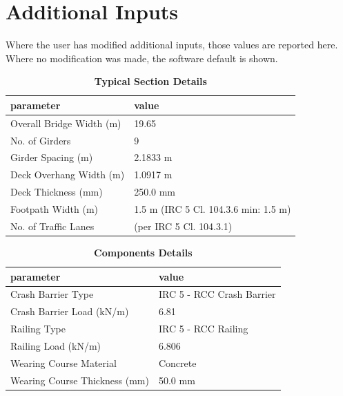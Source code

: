 \documentclass[12pt,a4paper]{report}
\numberwithin{table}{chapter}
\numberwithin{figure}{chapter}
\begin{document}
\newpage
\section{Additional Inputs}
\label{sec:additional-inputs}

Where the user has modified additional inputs, those values are reported here. Where no modification was made, the software default is shown.

\vspace{0.8cm}

\begin{longtable}{|L{5.5cm}|p{10.0cm}|}
\caption{\textbf{Typical Section Details}}
\hline
\textbf{parameter} & \textbf{value} \\
\hline
\textnormal{Overall Bridge Width (m)} & 19.65 \\[6pt]
\hline
\textnormal{No. of Girders} & 9 \\[6pt]
\hline
\textnormal{Girder Spacing (m)} & 2.1833 m \\[6pt]
\hline
\textnormal{Deck Overhang Width (m)} & 1.0917 m \\[6pt]
\hline
\textnormal{Deck Thickness (mm)} & 250.0 mm \\[6pt]
\hline
\textnormal{Footpath Width (m)} & 1.5 m (IRC 5 Cl. 104.3.6 min: 1.5 m) \\[6pt]
\hline
\textnormal{No. of Traffic Lanes} &  (per IRC 5 Cl. 104.3.1) \\[6pt]
\hline
\end{longtable}

\vspace{0.8em}

\begin{longtable}{|L{5.5cm}|p{10.0cm}|}
\caption{\textbf{Components Details}}
\hline
\textbf{parameter} & \textbf{value} \\
\hline
\textnormal{Crash Barrier Type} & IRC 5 - RCC Crash Barrier \\[6pt]
\hline
\textnormal{Crash Barrier Load (kN/m)} & 6.81 \\[6pt]
\hline

\textnormal{Railing Type} & IRC 5 - RCC Railing \\[6pt]
\hline
\textnormal{Railing Load (kN/m)} & 6.806 \\[6pt]
\hline
\textnormal{Wearing Course Material} & Concrete \\[6pt]
\hline
\textnormal{Wearing Course Thickness (mm)} & 50.0 mm \\[6pt]
\hline
\end{longtable}
\end{document}
